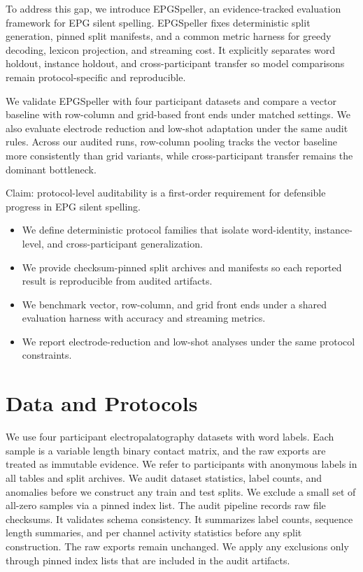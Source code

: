 \documentclass{Interspeech}
\begin{document}
To address this gap, we introduce EPGSpeller, an evidence-tracked evaluation framework for EPG silent spelling. EPGSpeller fixes deterministic split generation, pinned split manifests, and a common metric harness for greedy decoding, lexicon projection, and streaming cost. It explicitly separates word holdout, instance holdout, and cross-participant transfer so model comparisons remain protocol-specific and reproducible.

We validate EPGSpeller with four participant datasets and compare a vector baseline with row-column and grid-based front ends under matched settings. We also evaluate electrode reduction and low-shot adaptation under the same audit rules. Across our audited runs, row-column pooling tracks the vector baseline more consistently than grid variants, while cross-participant transfer remains the dominant bottleneck.

Claim: protocol-level auditability is a first-order requirement for defensible progress in EPG silent spelling.

\begin{itemize}
\item We define deterministic protocol families that isolate word-identity, instance-level, and cross-participant generalization.
\item We provide checksum-pinned split archives and manifests so each reported result is reproducible from audited artifacts.
\item We benchmark vector, row-column, and grid front ends under a shared evaluation harness with accuracy and streaming metrics.
\item We report electrode-reduction and low-shot analyses under the same protocol constraints.
\end{itemize}

\section{Data and Protocols}

We use four participant electropalatography datasets with word labels. Each sample is a variable length binary contact matrix, and the raw exports are treated as immutable evidence. We refer to participants with anonymous labels in all tables and split archives. We audit dataset statistics, label counts, and anomalies before we construct any train and test splits. We exclude a small set of all-zero samples via a pinned index list. The audit pipeline records raw file checksums. It validates schema consistency. It summarizes label counts, sequence length summaries, and per channel activity statistics before any split construction. The raw exports remain unchanged. We apply any exclusions only through pinned index lists that are included in the audit artifacts.
\end{document}
